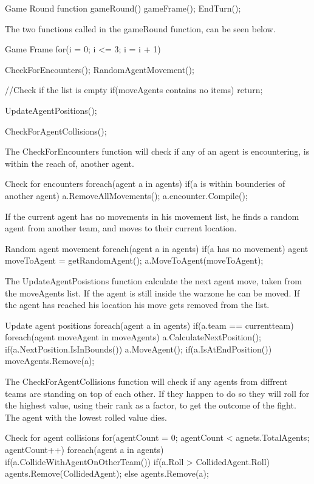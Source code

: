 \begin{source}{Game Round}{}
function gameRound()
{
	gameFrame();
	EndTurn();
}
\end{source}

The two functions called in the gameRound function, can be seen below.

\begin{source}{Game Frame}{}
for(i = 0; i <= 3; i = i + 1)
{
	CheckForEncounters();
	RandomAgentMovement();
	
	//Check if the list is empty
	if(moveAgents contains no items)
		return;
		
	UpdateAgentPositions();
	
	CheckForAgentCollisions();
}

\end{source}

The CheckForEncounters function will check if any of an agent is encountering, is within the reach of, another agent.
\begin{source}{Check for encounters}{}
foreach(agent a in agents)
{
	if(a is within bounderies of another agent)
	{
		a.RemoveAllMovements();
		a.encounter.Compile();
	}
}
\end{source}

If the current agent has no movements in his movement list, he finds a random agent from another team, and moves to their current location.
\begin{source}{Random agent movement}{}
foreach(agent a in agents)
{
	if(a has no movement)
	{
		agent moveToAgent = getRandomAgent();
		a.MoveToAgent(moveToAgent);
	}
}
\end{source}

The UpdateAgentPosistions function calculate the next agent move, taken from the moveAgents list. If the agent is still inside the warzone he can be moved. If the agent has reached his location his move gets removed from the list.
\begin{source}{Update agent positions}{}
foreach(agent a in agents)
{
	if(a.team == currentteam)
	{
		foreach(agent moveAgent in moveAgents)
		{
			a.CalculateNextPosition();
			if(a.NextPosition.IsInBounds())
			{
				a.MoveAgent();
			}
			if(a.IsAtEndPosition())
			{
				moveAgents.Remove(a);
			}
		}
	}
}
\end{source}

The CheckForAgentCollisions function will check if any agents from diffrent teams are standing on top of each other. If they happen to do so they will roll for the highest value, using their rank as a factor, to get the outcome of the fight. The agent with the lowest rolled value dies.
\begin{source}{Check for agent collisions}{}
for(agentCount = 0; agentCount < agnets.TotalAgents; agentCount++)
{
	foreach(agent a in agents)
	{
		if(a.CollideWithAgentOnOtherTeam())
		{
			if(a.Roll > CollidedAgent.Roll)
			{
				agents.Remove(CollidedAgent);
			}
			else
			{
				agents.Remove(a);
			}
		}
	}
}
\end{source}

